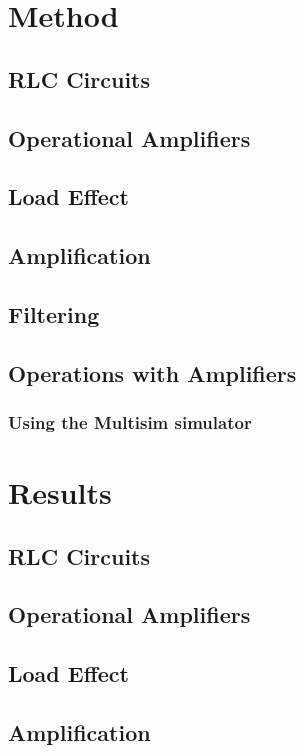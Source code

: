 \documentclass[12pt]{article}
\begin{document}
    
    \section{Method}
        \subsection{RLC Circuits}
        \subsection{Operational Amplifiers}
        \subsection{Load Effect}
        \subsection{Amplification}
        \subsection{Filtering}
        \subsection{Operations with Amplifiers}
            \subsubsection{Using the Multisim simulator}
            
            
    \section{Results}
        \subsection{RLC Circuits}
        \subsection{Operational Amplifiers}
        \subsection{Load Effect}
        \subsection{Amplification}
\end{document}
